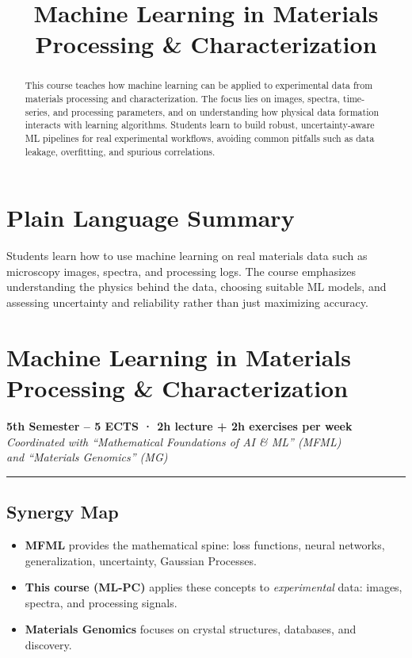 \documentclass[
]{agujournal2019}
\providecommand{\tightlist}{%
  \setlength{\itemsep}{0pt}\setlength{\parskip}{0pt}}
\begin{document}
\title{Machine Learning in Materials Processing \& Characterization}



\begin{abstract}
This course teaches how machine learning can be applied to experimental
data from materials processing and characterization. The focus lies on
images, spectra, time-series, and processing parameters, and on
understanding how physical data formation interacts with learning
algorithms. Students learn to build robust, uncertainty-aware ML
pipelines for real experimental workflows, avoiding common pitfalls such
as data leakage, overfitting, and spurious correlations.
\end{abstract}

\section*{Plain Language Summary}
Students learn how to use machine learning on real materials data such
as microscopy images, spectra, and processing logs. The course
emphasizes understanding the physics behind the data, choosing suitable
ML models, and assessing uncertainty and reliability rather than just
maximizing accuracy.




\section{Machine Learning in Materials Processing \&
Characterization}\label{machine-learning-in-materials-processing-characterization}

\textbf{5th Semester -- 5 ECTS · 2h lecture + 2h exercises per week}\\
\emph{Coordinated with ``Mathematical Foundations of AI \& ML'' (MFML)\\
and ``Materials Genomics'' (MG)}

\begin{center}\rule{0.5\linewidth}{0.5pt}\end{center}

\subsection{Synergy Map}\label{synergy-map}

\begin{itemize}
\tightlist
\item
  \textbf{MFML} provides the mathematical spine: loss functions, neural
  networks, generalization, uncertainty, Gaussian Processes.
\item
  \textbf{This course (ML-PC)} applies these concepts to
  \emph{experimental} data: images, spectra, and processing signals.
\item
  \textbf{Materials Genomics} focuses on crystal structures, databases,
  and discovery.
\end{itemize}
\end{document}
